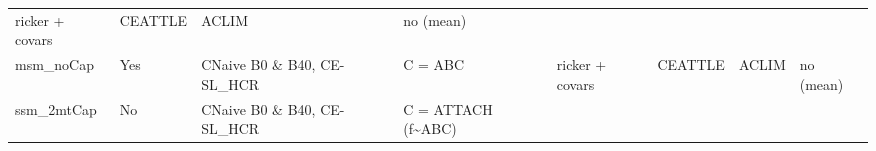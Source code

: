 \documentclass[]{article}
\begin{document}
\begin{longtable}[]{@{}llllllll@{}}
\begin{minipage}[t]{0.11\columnwidth}
ricker + covars\strut
\end{minipage} & \begin{minipage}[t]{0.10\columnwidth}\raggedright\strut
CEATTLE\strut
\end{minipage} & \begin{minipage}[t]{0.08\columnwidth}\raggedright\strut
ACLIM\strut
\end{minipage} & \begin{minipage}[t]{0.05\columnwidth}\raggedright\strut
no (mean)\strut
\end{minipage}\tabularnewline
\begin{minipage}[t]{0.16\columnwidth}\raggedright\strut
msm\_noCap\strut
\end{minipage} & \begin{minipage}[t]{0.06\columnwidth}\raggedright\strut
Yes\strut
\end{minipage} & \begin{minipage}[t]{0.13\columnwidth}\raggedright\strut
CNaive B0 \& B40, CE-SL\_HCR\strut
\end{minipage} & \begin{minipage}[t]{0.10\columnwidth}\raggedright\strut
C = ABC\strut
\end{minipage} & \begin{minipage}[t]{0.11\columnwidth}\raggedright\strut
ricker + covars\strut
\end{minipage} & \begin{minipage}[t]{0.10\columnwidth}\raggedright\strut
CEATTLE\strut
\end{minipage} & \begin{minipage}[t]{0.08\columnwidth}\raggedright\strut
ACLIM\strut
\end{minipage} & \begin{minipage}[t]{0.05\columnwidth}\raggedright\strut
no (mean)\strut
\end{minipage}\tabularnewline
\begin{minipage}[t]{0.16\columnwidth}\raggedright\strut
ssm\_2mtCap\strut
\end{minipage} & \begin{minipage}[t]{0.06\columnwidth}\raggedright\strut
No\strut
\end{minipage} & \begin{minipage}[t]{0.13\columnwidth}\raggedright\strut
CNaive B0 \& B40, CE-SL\_HCR\strut
\end{minipage} & \begin{minipage}[t]{0.10\columnwidth}\raggedright\strut
C = ATTACH (f\textasciitilde{}ABC)\strut

\end{minipage}
\end{longtable}
\end{document}
